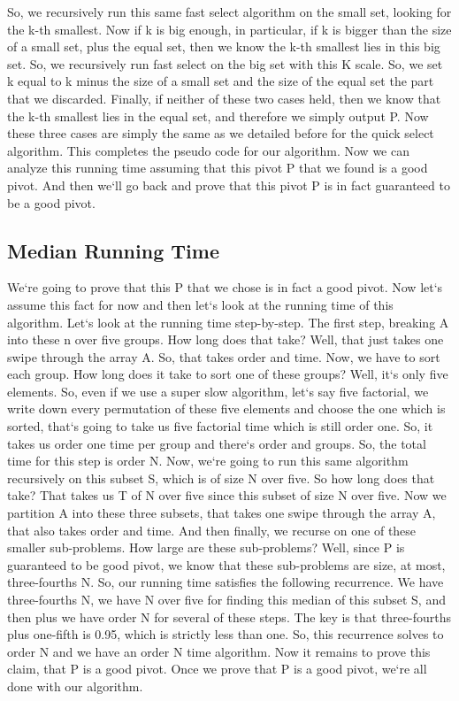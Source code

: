 So, we recursively run this same fast select algorithm on the small set, looking for the k-th smallest.
Now if k is big enough, in particular, if k is bigger than the size of a small set, plus the equal set, then we know the k-th smallest lies in this big set.
So, we recursively run fast select on the big set with this K scale.
So, we set k equal to k minus the size of a small set and the size of the equal set the part that we discarded.
Finally, if neither of these two cases held, then we know that the k-th smallest lies in the equal set, and therefore we simply output P\@.
Now these three cases are simply the same as we detailed before for the quick select algorithm.
This completes the pseudo code for our algorithm.
Now we can analyze this running time assuming that this pivot P that we found is a good pivot.
And then we`ll go back and prove that this pivot P is in fact guaranteed to be a good pivot.

\subsection{Median  Running Time}
We`re going to prove that this P that we chose is in fact a good pivot.
Now let`s assume this fact for now and then let`s look at the running time of this algorithm.
Let`s look at the running time step-by-step.
The first step, breaking A into these n over five groups.
How long does that take? Well, that just takes one swipe through the array A\@.
So, that takes order and time.
Now, we have to sort each group.
How long does it take to sort one of these groups? Well, it`s only five elements.
So, even if we use a super slow algorithm, let`s say five factorial, we write down every permutation of these five elements and choose the one which is sorted, that`s going to take us five factorial time which is still order one.
So, it takes us order one time per group and there`s order and groups.
So, the total time for this step is order N\@.
Now, we`re going to run this same algorithm recursively on this subset S, which is of size N over five.
So how long does that take? That takes us T of N over five since this subset of size N over five.
Now we partition A into these three subsets, that takes one swipe through the array A, that also takes order and time.
And then finally, we recurse on one of these smaller sub-problems.
How large are these sub-problems? Well, since P is guaranteed to be good pivot, we know that these sub-problems are size, at most, three-fourths N\@.
So, our running time satisfies the following recurrence.
We have three-fourths N, we have N over five for finding this median of this subset S, and then plus we have order N for several of these steps.
The key is that three-fourths plus one-fifth is 0.95, which is strictly less than one.
So, this recurrence solves to order N and we have an order N time algorithm.
Now it remains to prove this claim, that P is a good pivot.
Once we prove that P is a good pivot, we`re all done with our algorithm.

